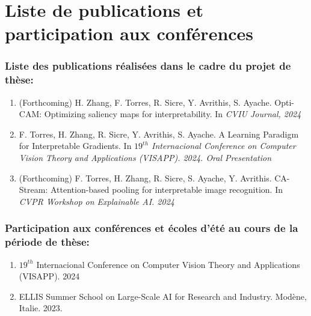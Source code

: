 \newpage
\chapter*{Liste de publications et participation aux conférences}
\subsection*{Liste des publications réalisées dans le cadre du projet de thèse:}
\begin{enumerate}
    \item (Forthcoming) H. Zhang, F. Torres, R. Sicre, Y. Avrithis, S. Ayache. Opti-CAM: 
    Optimizing saliency maps for interpretability. In \emph{CVIU Journal, 2024}
    \item F. Torres, H. Zhang, R. Sicre, Y. Avrithis, S. Ayache. A Learning Paradigm for 
    Interpretable Gradients. In \emph{$19^{th}$ Internacional Conference on Computer Vision 
    Theory and Applications (VISAPP). 2024. Oral Presentation}
    \item (Forthcoming) F. Torres, H. Zhang, R. Sicre, S. Ayache, Y. Avrithis. CA-Stream: 
    Attention-based pooling for interpretable image recognition. In \emph{CVPR Workshop 
    on Explainable AI. 2024}
\end{enumerate}


\subsection*{Participation aux conférences et écoles d’été au cours de la période de thèse:}
\begin{enumerate}
\item $19^{th}$ Internacional Conference on Computer Vision Theory and Applications (VISAPP). 2024
\item ELLIS Summer School on Large-Scale AI for Research and Industry. Modène, Italie. 2023.
\end{enumerate}
